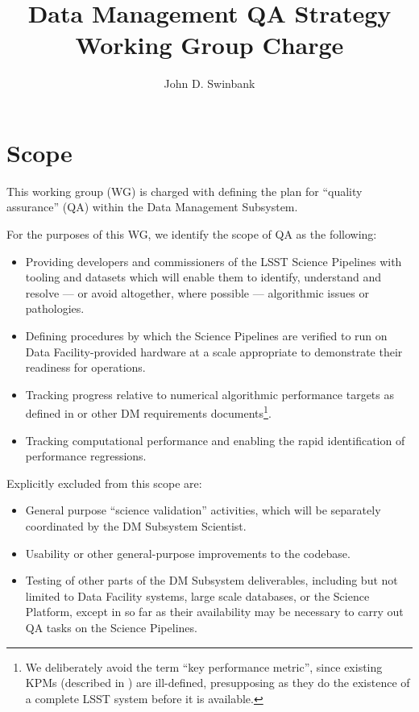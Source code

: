 \documentclass[DM,lsstdraft,toc]{lsstdoc}
\title[DM QA WG]{Data Management QA Strategy Working Group Charge}
\author{John D. Swinbank}
\begin{document}
\maketitle

\section{Scope}

This working group (WG) is charged with defining the plan for ``quality
assurance'' (QA) within the Data Management Subsystem.

For the purposes of this WG, we identify the scope of QA as the following:

\begin{itemize}

  \item{Providing developers and commissioners of the LSST Science Pipelines
  with tooling and datasets which will enable them to identify, understand and
  resolve --- or avoid altogether, where possible --- algorithmic issues or
  pathologies.}

  \item{Defining procedures by which the Science Pipelines are verified to run
  on Data Facility-provided hardware at a scale appropriate to demonstrate
  their readiness for operations.}

  \item{Tracking progress relative to numerical algorithmic performance
  targets as defined in  or other DM requirements
  documents\footnote{We deliberately avoid the term ``key performance
  metric'', since existing KPMs (described in ) are
  ill-defined, presupposing as they do the existence of a complete LSST
  system before it is available.}.}

  \item{Tracking computational performance and enabling the rapid
  identification of performance regressions.}

\end{itemize}

Explicitly excluded from this scope are:

\begin{itemize}

  \item{General purpose ``science validation'' activities, which will be
  separately coordinated by the DM Subsystem Scientist.}

  \item{Usability or other general-purpose improvements to the codebase.}

  \item{Testing of other parts of the DM Subsystem deliverables, including but
  not limited to Data Facility systems, large scale databases, or the Science
  Platform, except in so far as their availability may be necessary to carry
  out QA tasks on the Science Pipelines.}

\end{itemize}
\end{document}
